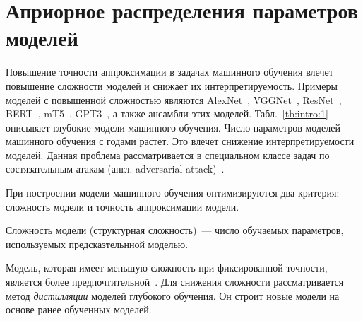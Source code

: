 \chapter{Априорное распределения параметров моделей}

Повышение точности аппроксимации в задачах машинного обучения влечет повышение сложности моделей и снижает их интерпретируемость.
Примеры моделей с повышенной сложностью являются AlexNet~\cite{Krizhevsky2012}, VGGNet~\cite{Simonyan2014}, ResNet~\cite{Kaiming2015}, BERT~\cite{Devlin2018, Vaswani2017}, mT5~\cite{Linting2021}, GPT3~\cite{Brown2020}, а также ансамбли этих моделей.
Табл.~\ref{tb:intro:1} описывает глубокие модели машинного обучения.
Число параметров моделей машинного обучения с годами растет.
Это влечет снижение интерпретируемости моделей.
Данная проблема рассматривается в специальном классе задач по состязательным атакам (англ. adversarial attack)~\cite{Zheng2020}.

\begin{table}[!ht]
\caption{Анализ роста числа параметров при развитии моделей глубокого обучения}
\label{tb:intro:1}
\begin{center}
\end{center}
\end{table}


При построении модели машинного обучения оптимизируются два критерия: сложность модели и точность аппроксимации модели.
\begin{definition}
Сложность модели (структурная сложность)~--- число обучаемых параметров, используемых предсказтельнной моделью.
\end{definition}
Модель, которая имеет меньшую сложность при фиксированной точности, является более предпочтительной~\cite{bachteev2018}. Для снижения сложности рассматривается метод \textit{дистилляции} моделей глубокого обучения. Он строит новые модели на основе ранее обученных моделей.

